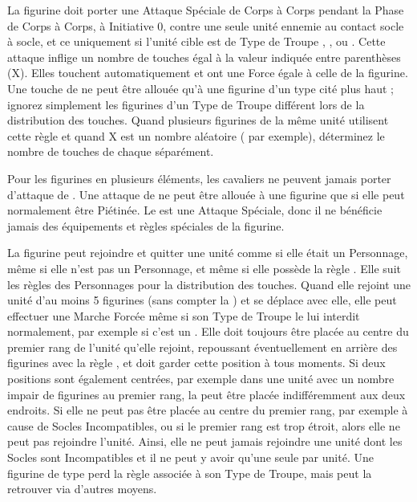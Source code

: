 
La figurine doit porter une Attaque Spéciale de Corps à Corps pendant la Phase de Corps à Corps, à Initiative 0, contre une seule unité ennemie au contact socle à socle, et ce uniquement si l'unité cible est de Type de Troupe \infantry{}, \warbeast{}, \swarm{} ou \warmachine{}. Cette attaque inflige un nombre de touches égal à la valeur indiquée entre parenthèses (X). Elles touchent automatiquement et ont une Force égale à celle de la figurine. Une touche de \stomp{} ne peut être allouée qu'à une figurine d'un type cité plus haut ; ignorez simplement les figurines d'un Type de Troupe différent lors de la distribution des touches. Quand plusieurs figurines de la même unité utilisent cette règle et quand X est un nombre aléatoire ( par exemple), déterminez le nombre de touches de chaque \stomp{} séparément.

Pour les figurines en plusieurs éléments, les cavaliers ne peuvent jamais porter d'attaque de \stomp{}. Une attaque de \stomp{} ne peut être allouée à une figurine que si elle peut normalement être Piétinée. Le \stomp{} est une Attaque Spéciale, donc il ne bénéficie jamais des équipements et règles spéciales de la figurine.

\label{warplatform}

La figurine peut rejoindre et quitter une unité comme si elle était un Personnage, même si elle n'est pas un Personnage, et même si elle possède la règle \toweringpresence{}. Elle suit les règles des Personnages pour la distribution des touches. Quand elle rejoint une unité d'au moins 5 figurines (sans compter la \warplatform{}) et se déplace avec elle, elle peut effectuer une Marche Forcée même si son Type de Troupe le lui interdit normalement, par exemple si c'est un \chariot{}. Elle doit toujours être placée au centre du premier rang de l'unité qu'elle rejoint, repoussant éventuellement en arrière des figurines avec la règle \frontrank{}, et doit garder cette position à tous moments. Si deux positions sont également centrées, par exemple dans une unité avec un nombre impair de figurines au premier rang, la \warplatform{} peut être placée indifféremment aux deux endroits. Si elle ne peut pas être placée au centre du premier rang, par exemple à cause de Socles Incompatibles, ou si le premier rang est trop étroit, alors elle ne peut pas rejoindre l'unité. Ainsi, elle ne peut jamais rejoindre une unité dont les Socles sont Incompatibles et il ne peut y avoir qu'une seule \warplatform{} par unité. Une figurine de type \chariot{} perd la règle \swiftstride{} associée à son Type de Troupe, mais peut la retrouver via d'autres moyens.

